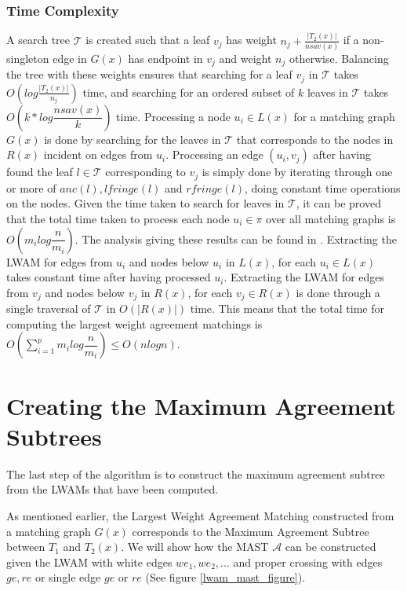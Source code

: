 \subsubsection{Time Complexity}
A search tree $\mathcal{T}$ is created such that a leaf $v_j$ has weight $n_j + \frac{|T_2(x)|}{nsav(x)}$ if a non-singleton edge in $G(x)$ has endpoint in $v_j$ and weight $n_j$ otherwise. Balancing the tree with these weights ensures that searching for a leaf $v_j$ in $\mathcal{T}$ takes $O(log\frac{|T_2(x)|}{n_j})$ time, and searching for an ordered subset of $k$ leaves in $\mathcal{T}$ takes $O(k*log \dfrac{nsav(x)}{k})$ time. Processing a node $u_i \in L(x)$ for a matching graph $G(x)$ is done by searching for the leaves in $\mathcal{T}$ that corresponds to the nodes in $R(x)$ incident on edges from $u_i$. Processing an edge $(u_i, v_j)$ after having found the leaf $l \in \mathcal{T}$ corresponding to $v_j$ is simply done by iterating through one or more of $anc(l), lfringe(l)$ and $rfringe(l)$, doing constant time operations on the nodes. Given the time taken to search for leaves in $\mathcal{T}$, it can be proved that the total time taken to process each node $u_i \in \pi$ over all matching graphs is $O(m_ilog\dfrac{n}{m_i})$. The analysis giving these results can be found in \cite{nlogn}. Extracting the LWAM for edges from $u_i$ and nodes below $u_i$ in $L(x)$, for each $u_i \in L(x)$ takes constant time after having processed $u_i$. Extracting the LWAM for edges from $v_j$ and nodes below $v_j$ in $R(x)$, for each $v_j \in R(x)$ is done through a single traversal of $\mathcal{T}$ in $O(|R(x)|)$ time. This means that the total time for computing the largest weight agreement matchings is $O(\sum_{i=1}^p m_ilog\dfrac{n}{m_i}) \le O(nlogn)$.

\section{Creating the Maximum Agreement Subtrees}
The last step of the algorithm is to construct the maximum agreement subtree from the LWAMs that have been computed.

As mentioned earlier, the Largest Weight Agreement Matching constructed from a matching graph $G(x)$ corresponds to the Maximum Agreement Subtree between $T_1$ and $T_2(x)$. We will show how the MAST $\mathcal{A}$ can be constructed given the LWAM with white edges ${we_1, we_2, ...}$ and proper crossing with edges ${ge, re}$ or single edge $ge$ or $re$ (See figure \ref{lwam_mast_figure}).

